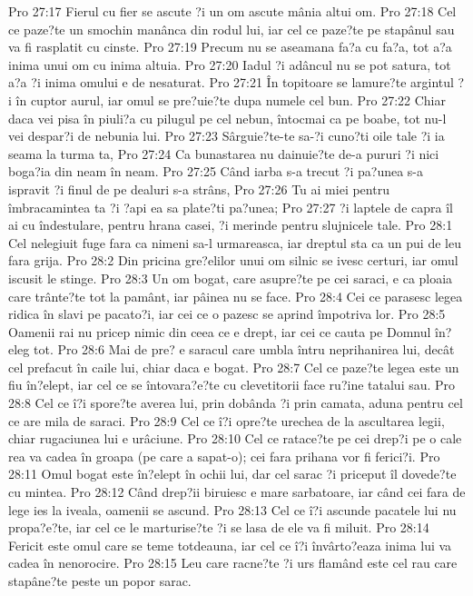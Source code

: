 Pro 27:17  Fierul cu fier se ascute ?i un om ascute mânia altui om.
Pro 27:18  Cel ce paze?te un smochin manânca din rodul lui, iar cel ce paze?te pe stapânul sau va fi rasplatit cu cinste.
Pro 27:19  Precum nu se aseamana fa?a cu fa?a, tot a?a inima unui om cu inima altuia.
Pro 27:20  Iadul ?i adâncul nu se pot satura, tot a?a ?i inima omului e de nesaturat.
Pro 27:21  În topitoare se lamure?te argintul ?i în cuptor aurul, iar omul se pre?uie?te dupa numele cel bun.
Pro 27:22  Chiar daca vei pisa în piuli?a cu pilugul pe cel nebun, întocmai ca pe boabe, tot nu-l vei despar?i de nebunia lui.
Pro 27:23  Sârguie?te-te sa-?i cuno?ti oile tale ?i ia seama la turma ta,
Pro 27:24  Ca bunastarea nu dainuie?te de-a pururi ?i nici boga?ia din neam în neam.
Pro 27:25  Când iarba s-a trecut ?i pa?unea s-a ispravit ?i finul de pe dealuri s-a strâns,
Pro 27:26  Tu ai miei pentru îmbracamintea ta ?i ?api ea sa plate?ti pa?unea;
Pro 27:27  ?i laptele de capra îl ai cu îndestulare, pentru hrana casei, ?i merinde pentru slujnicele tale.
Pro 28:1  Cel nelegiuit fuge fara ca nimeni sa-l urmareasca, iar dreptul sta ca un pui de leu fara grija.
Pro 28:2  Din pricina gre?elilor unui om silnic se ivesc certuri, iar omul iscusit le stinge.
Pro 28:3  Un om bogat, care asupre?te pe cei saraci, e ca ploaia care trânte?te tot la pamânt, iar pâinea nu se face.
Pro 28:4  Cei ce parasesc legea ridica în slavi pe pacato?i, iar cei ce o pazesc se aprind împotriva lor.
Pro 28:5  Oamenii rai nu pricep nimic din ceea ce e drept, iar cei ce cauta pe Domnul în?eleg tot.
Pro 28:6  Mai de pre? e saracul care umbla întru neprihanirea lui, decât cel prefacut în caile lui, chiar daca e bogat.
Pro 28:7  Cel ce paze?te legea este un fiu în?elept, iar cel ce se întovara?e?te cu clevetitorii face ru?ine tatalui sau.
Pro 28:8  Cel ce î?i spore?te averea lui, prin dobânda ?i prin camata, aduna pentru cel ce are mila de saraci.
Pro 28:9  Cel ce î?i opre?te urechea de la ascultarea legii, chiar rugaciunea lui e urâciune.
Pro 28:10  Cel ce ratace?te pe cei drep?i pe o cale rea va cadea în groapa (pe care a sapat-o); cei fara prihana vor fi ferici?i.
Pro 28:11  Omul bogat este în?elept în ochii lui, dar cel sarac ?i priceput îl dovede?te cu mintea.
Pro 28:12  Când drep?ii biruiesc e mare sarbatoare, iar când cei fara de lege ies la iveala, oamenii se ascund.
Pro 28:13  Cel ce î?i ascunde pacatele lui nu propa?e?te, iar cel ce le marturise?te ?i se lasa de ele va fi miluit.
Pro 28:14  Fericit este omul care se teme totdeauna, iar cel ce î?i învârto?eaza inima lui va cadea în nenorocire.
Pro 28:15  Leu care racne?te ?i urs flamând este cel rau care stapâne?te peste un popor sarac.
